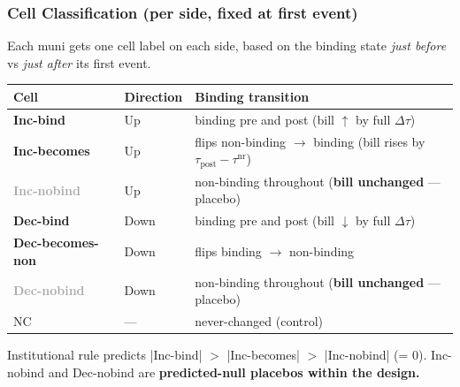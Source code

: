 \documentclass[xcolor = x11names, compress, aspectratio = 169]{beamer}
\begin{document}
    \begin{frame}
    \frametitle{Cell Classification (per side, fixed at first event)}
        \footnotesize
        Each muni gets one cell label on each side, based on the
        binding state \emph{just before} vs \emph{just after} its first event.
        \medskip
        \scriptsize
        \renewcommand{\arraystretch}{1.20}
        \setlength{\tabcolsep}{6pt}
        \begin{tabular}{lll}
            \toprule
            Cell & Direction & Binding transition \\
            \midrule
            \textcolor{GopherMaroon}{\textbf{Inc-bind}}     & Up   & binding pre and post (bill $\uparrow$ by full $\Delta\tau$) \\
            \textcolor{GopherMaroon!70}{\textbf{Inc-becomes}} & Up   & flips non-binding $\to$ binding (bill rises by $\tau_{\text{post}} - \tau^{\text{nr}}$) \\
            \textcolor{DarkGray}{\textbf{Inc-nobind}}        & Up   & non-binding throughout (\textbf{bill unchanged} --- placebo) \\
            \textcolor{GopherDarkMaroon}{\textbf{Dec-bind}}  & Down & binding pre and post (bill $\downarrow$ by full $\Delta\tau$) \\
            \textbf{Dec-becomes-non}                          & Down & flips binding $\to$ non-binding \\
            \textcolor{DarkGray}{\textbf{Dec-nobind}}         & Down & non-binding throughout (\textbf{bill unchanged} --- placebo) \\
            NC                                                & ---  & never-changed (control) \\
            \bottomrule
        \end{tabular}
        \medskip
        \footnotesize
        Institutional rule predicts |Inc-bind| $>$ |Inc-becomes| $>$ |Inc-nobind|
        (= 0). Inc-nobind and Dec-nobind are \textbf{predicted-null
        placebos within the design.}
    \end{frame}
\end{document}
